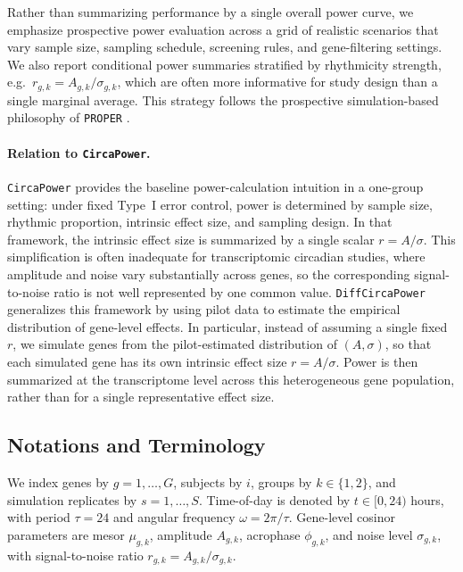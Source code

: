 \documentclass{article}
\newcommand{\software}[1]{\texttt{#1}}
\begin{document}
Rather than summarizing performance by a single overall power curve, we
emphasize prospective power evaluation across a grid of realistic scenarios
that vary sample size, sampling schedule, screening rules, and gene-filtering
settings. We also report conditional power summaries stratified by rhythmicity
strength, e.g.\ $r_{g,k}=A_{g,k}/\sigma_{g,k}$, which are often more
informative for study design than a single marginal average. This strategy follows
the prospective simulation-based philosophy of \software{PROPER}
\cite{wu2015proper}.

\paragraph{Relation to \software{CircaPower}.}
\software{CircaPower} provides the baseline power-calculation intuition in a
one-group setting: under fixed Type~I error control, power is determined by
sample size, rhythmic proportion, intrinsic effect size, and sampling design.
In that framework, the intrinsic effect size is summarized by a single scalar
$r=A/\sigma$. This simplification is often inadequate for transcriptomic
circadian studies, where amplitude and noise vary substantially across genes,
so the corresponding signal-to-noise ratio is not well represented by one
common value. \software{DiffCircaPower} generalizes this framework by using
pilot data to estimate the empirical distribution of gene-level effects. In
particular, instead of assuming a single fixed $r$, we simulate genes from the
pilot-estimated distribution of $(A,\sigma)$, so that each simulated gene has
its own intrinsic effect size $r=A/\sigma$. Power is then summarized at the
transcriptome level across this heterogeneous gene population, rather than for
a single representative effect size.

\subsection{Notations and Terminology}
\label{sec:notation}

We index genes by $g=1,\ldots,G$, subjects by $i$, groups by
$k\in\{1,2\}$, and simulation replicates by $s=1,\ldots,S$. Time-of-day is
denoted by $t\in[0,24)$ hours, with period $\tau=24$ and angular frequency
$\omega=2\pi/\tau$. Gene-level cosinor parameters are mesor $\mu_{g,k}$,
amplitude $A_{g,k}$, acrophase $\phi_{g,k}$, and noise level $\sigma_{g,k}$,
with signal-to-noise ratio $r_{g,k}=A_{g,k}/\sigma_{g,k}$.
\end{document}
